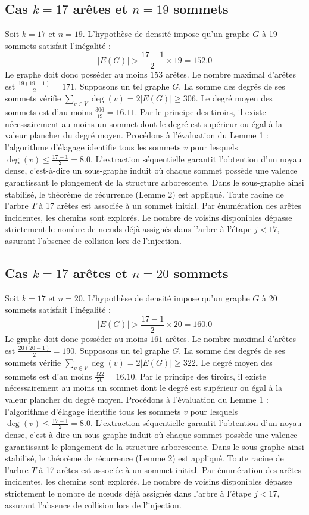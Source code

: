 \documentclass[12pt,a4paper]{article}
\begin{document}
\subsection{Cas $k = 17$ arêtes et $n = 19$ sommets}
Soit $k = 17$ et $n = 19$. L'hypothèse de densité impose qu'un graphe $G$ à 19 sommets satisfait l'inégalité :
$$ |E(G)| > \frac{17-1}{2} \times 19 = 152.0 $$
Le graphe doit donc posséder au moins $153$ arêtes. Le nombre maximal d'arêtes est $\frac{19(19-1)}{2} = 171$.
Supposons un tel graphe $G$. La somme des degrés de ses sommets vérifie $\sum_{v \in V} \deg(v) = 2|E(G)| \geq 306$.
Le degré moyen des sommets est d'au moins $\frac{306}{19} = 16.11$.
Par le principe des tiroirs, il existe nécessairement au moins un sommet dont le degré est supérieur ou égal à la valeur plancher du degré moyen.
Procédons à l'évaluation du Lemme 1 : l'algorithme d'élagage identifie tous les sommets $v$ pour lesquels $\deg(v) \leq \frac{17-1}{2} = 8.0$.
L'extraction séquentielle garantit l'obtention d'un noyau dense, c'est-à-dire un sous-graphe induit où chaque sommet possède une valence garantissant le plongement de la structure arborescente.
Dans le sous-graphe ainsi stabilisé, le théorème de récurrence (Lemme 2) est appliqué. Toute racine de l'arbre $T$ à 17 arêtes est associée à un sommet initial. Par énumération des arêtes incidentes, les chemins sont explorés. Le nombre de voisins disponibles dépasse strictement le nombre de nœuds déjà assignés dans l'arbre à l'étape $j < 17$, assurant l'absence de collision lors de l'injection.

\subsection{Cas $k = 17$ arêtes et $n = 20$ sommets}
Soit $k = 17$ et $n = 20$. L'hypothèse de densité impose qu'un graphe $G$ à 20 sommets satisfait l'inégalité :
$$ |E(G)| > \frac{17-1}{2} \times 20 = 160.0 $$
Le graphe doit donc posséder au moins $161$ arêtes. Le nombre maximal d'arêtes est $\frac{20(20-1)}{2} = 190$.
Supposons un tel graphe $G$. La somme des degrés de ses sommets vérifie $\sum_{v \in V} \deg(v) = 2|E(G)| \geq 322$.
Le degré moyen des sommets est d'au moins $\frac{322}{20} = 16.10$.
Par le principe des tiroirs, il existe nécessairement au moins un sommet dont le degré est supérieur ou égal à la valeur plancher du degré moyen.
Procédons à l'évaluation du Lemme 1 : l'algorithme d'élagage identifie tous les sommets $v$ pour lesquels $\deg(v) \leq \frac{17-1}{2} = 8.0$.
L'extraction séquentielle garantit l'obtention d'un noyau dense, c'est-à-dire un sous-graphe induit où chaque sommet possède une valence garantissant le plongement de la structure arborescente.
Dans le sous-graphe ainsi stabilisé, le théorème de récurrence (Lemme 2) est appliqué. Toute racine de l'arbre $T$ à 17 arêtes est associée à un sommet initial. Par énumération des arêtes incidentes, les chemins sont explorés. Le nombre de voisins disponibles dépasse strictement le nombre de nœuds déjà assignés dans l'arbre à l'étape $j < 17$, assurant l'absence de collision lors de l'injection.
\end{document}
